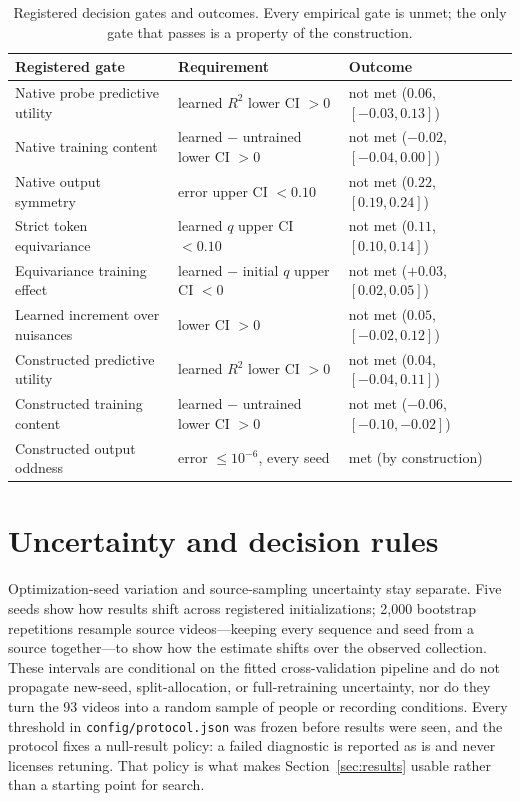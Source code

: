 \documentclass{article}
\begin{document}
\begin{table}[t]
  \centering
  \caption{Registered decision gates and outcomes. Every empirical gate is unmet; the only gate that passes is a property of the construction.}
  \label{tab:decisions}
  \small
  \begin{tabular}{lll}
    \toprule
    Registered gate & Requirement & Outcome \\
    \midrule
    Native probe predictive utility & learned $R^2$ lower CI $>0$ & not met ($0.06$, $[-0.03,0.13]$) \\
    Native training content & learned $-$ untrained lower CI $>0$ & not met ($-0.02$, $[-0.04,0.00]$) \\
    Native output symmetry & error upper CI $<0.10$ & not met ($0.22$, $[0.19,0.24]$) \\
    Strict token equivariance & learned $q$ upper CI $<0.10$ & not met ($0.11$, $[0.10,0.14]$) \\
    Equivariance training effect & learned $-$ initial $q$ upper CI $<0$ & not met ($+0.03$, $[0.02,0.05]$) \\
    Learned increment over nuisances & lower CI $>0$ & not met ($0.05$, $[-0.02,0.12]$) \\
    Constructed predictive utility & learned $R^2$ lower CI $>0$ & not met ($0.04$, $[-0.04,0.11]$) \\
    Constructed training content & learned $-$ untrained lower CI $>0$ & not met ($-0.06$, $[-0.10,-0.02]$) \\
    Constructed output oddness & error $\leq 10^{-6}$, every seed & met (by construction) \\
    \bottomrule
  \end{tabular}
\end{table}

\section{Uncertainty and decision rules}

Optimization-seed variation and source-sampling uncertainty stay separate. Five seeds show how results shift across registered initializations; 2,000 bootstrap repetitions resample source videos---keeping every sequence and seed from a source together---to show how the estimate shifts over the observed collection. These intervals are conditional on the fitted cross-validation pipeline and do not propagate new-seed, split-allocation, or full-retraining uncertainty, nor do they turn the 93 videos into a random sample of people or recording conditions. Every threshold in \texttt{config/protocol.json} was frozen before results were seen, and the protocol fixes a null-result policy: a failed diagnostic is reported as is and never licenses retuning. That policy is what makes Section~\ref{sec:results} usable rather than a starting point for search.
\end{document}
